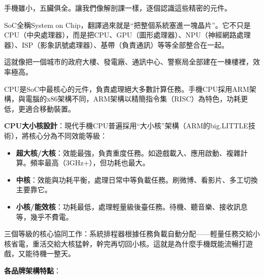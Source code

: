


手機雖小，五臟俱全。讓我們像解剖課一樣，逐個認識這些精密的元件。


SoC全稱System on Chip，翻譯過來就是“把整個系統塞進一塊晶片”。它不只是CPU（中央處理器），而是把CPU、GPU（圖形處理器）、NPU（神經網路處理器）、ISP（影象訊號處理器）、基帶（負責通訊）等等全部整合在一起。

這就像把一個城市的政府大樓、發電廠、通訊中心、警察局全部建在一棟樓裡，效率極高。


CPU是SoC中最核心的元件，負責處理絕大多數計算任務。手機CPU採用ARM架構，與電腦的x86架構不同，ARM架構以精簡指令集（RISC）為特色，功耗更低，更適合移動裝置。

\textbf{CPU大小核設計}：現代手機CPU普遍採用“大小核”架構（ARM的big.LITTLE技術），將核心分為不同效能等級：

\begin{itemize}
  \item \textbf{超大核/大核}：效能最強，負責重度任務。如遊戲載入、應用啟動、複雜計算。頻率最高（3GHz+），但功耗也最大。
  \item \textbf{中核}：效能與功耗平衡，處理日常中等負載任務。刷微博、看影片、多工切換主要靠它。
  \item \textbf{小核/能效核}：功耗最低，處理輕量級後臺任務。待機、聽音樂、接收訊息等，幾乎不費電。
\end{itemize}

三個等級的核心協同工作：系統排程器根據任務負載自動分配——輕量任務交給小核省電，重活交給大核猛幹，幹完再切回小核。這就是為什麼手機既能流暢打遊戲，又能待機一整天。

\textbf{各品牌架構特點}：

